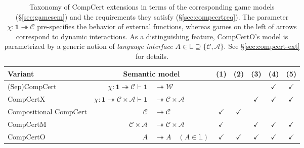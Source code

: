 \documentclass[11pt,oneside,draft]{book}
\theoremstyle{definition}
\begin{document}
\begin{table} %
  \small
  \centering
  \begin{tabular}{lr@{}lc@{\:}c@{\:}c@{\:}c@{\:}c}
    \hline
    Variant & \multicolumn{2}{c}{Semantic model} & (1) & (2) & (3) & (4) & (5) \\
    \hline
    (Sep)CompCert \citep{compcert,sepcompcert} &
      $\chi : \mathbf{1} \twoheadrightarrow \mathcal{C}
      \vdash \mathbf{1} $ & ${} \twoheadrightarrow \mathcal{W}$ &
      & & & $\checkmark$ & $\checkmark$ \\
    CompCertX \citep{popl15} &
      \hspace{-1ex}
      $\chi : \mathbf{1} \twoheadrightarrow \mathcal{C} \times \mathcal{A}
       \vdash
       \mathbf{1} $ & ${} \twoheadrightarrow \mathcal{C} \times \mathcal{A}$
      & & & $\checkmark$ & $\checkmark$ & $\checkmark$ \\
    Compositional CompCert \citep{compcompcert} &
      $\mathcal{C}$ & ${} \twoheadrightarrow \mathcal{C}$ &
      $\checkmark$ & $\checkmark$ & & & \\
    CompCertM \citep{compcertm} &
      $\mathcal{C} \times \mathcal{A} $ & ${}\twoheadrightarrow
       \mathcal{C} \times \mathcal{A}$ &
      $\checkmark$ & & $\checkmark$ & $\checkmark$ & $\checkmark$ \\
    CompCertO &
      $A $ & ${}\twoheadrightarrow A \quad
      (A \in \mathbb{L})$ &
      $\checkmark$&$\checkmark$&$\checkmark$&$\checkmark$&$\checkmark$ \\
    \hline
  \end{tabular}
  \caption[Taxonomy of CompCert extensions]%
   {Taxonomy of CompCert extensions
    in terms of the corresponding game models (\S\ref{sec:gamesem})
    and the requirements they satisfy (\S\ref{sec:compcertreq}).
    The parameter $\chi : \mathbf{1} \twoheadrightarrow \mathcal{C}$
    pre-specifies the behavior of external functions,
    whereas games on the left of arrows
    correspond to dynamic interactions.
    As a distinguishing feature,
    CompCertO's model is parametrized by a generic notion of
    \emph{language interface}
    $A \in \mathbb{L} \supseteq \{\mathcal{C}, \mathcal{A}\}$.
    See \S\ref{sec:compcert-ext} for details.
  }
  \label{tbl:compcerts}
\end{table}
\end{document}
